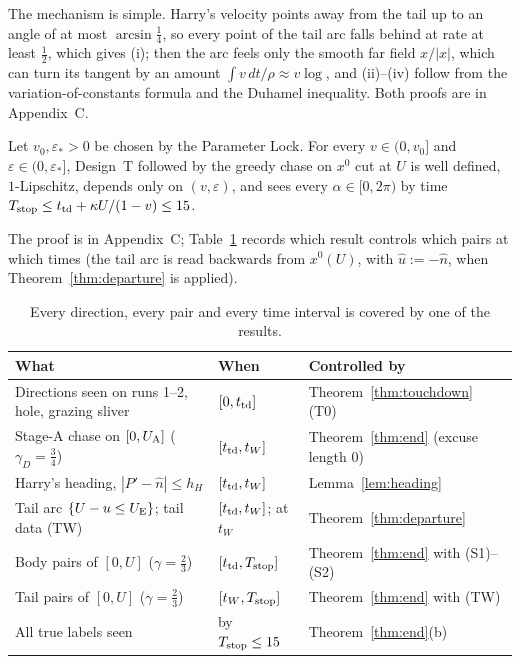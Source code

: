 The mechanism is simple. Harry's velocity points away from the tail up to an angle of at most $\arcsin\frac14$, so every
point of the tail arc falls behind at rate at least $\frac12$, which gives (i); then the arc feels only the smooth far
field $x/|x|$, which can turn its tangent by an amount $\int v\,dt/\rho\approx v\log$, and (ii)--(iv) follow from the
variation-of-constants formula and the Duhamel inequality. Both proofs are in Appendix~C.

\begin{proposition}[Conditional form for $d=1$]\label{prop:cond}
Let $v_0,\varepsilon_*>0$ be chosen by the Parameter Lock. For every $v\in(0,v_0]$ and $\varepsilon\in(0,\varepsilon_*]$,
Design~T followed by the greedy chase on $x^0$ cut at $U$ is well defined, $1$-Lipschitz, depends only on
$(v,\varepsilon)$, and sees every $\alpha\in[0,2\pi)$ by time $T_{\mathrm{stop}}\le t_{\mathrm{td}}+\kappa U/(1-v)\le15$.
\end{proposition}

The proof is in Appendix~C; Table~\ref{tab:coverage} records which result controls which pairs at which times (the
tail arc is read backwards from $x^0(U)$, with $\hat u:=-\hat n$, when Theorem~\ref{thm:departure} is applied).

\begin{table}[!htbp]
\centering
\small
\begin{tabularx}{\linewidth}{l l >{\raggedright\arraybackslash}X}
\toprule
\textbf{What} & \textbf{When} & \textbf{Controlled by} \\
\midrule
Directions seen on runs 1--2, hole, grazing sliver & $[0,t_{\mathrm{td}}]$ & Theorem~\ref{thm:touchdown} (T0) \\
Stage-A chase on $[0,U_{\mathrm{A}}]$ ($\gamma_D=\frac34$) & $[t_{\mathrm{td}},t_W]$ & Theorem~\ref{thm:end} (excuse length $0$) \\
Harry's heading, $|P'-\hat n|\le h_H$ & $[t_{\mathrm{td}},t_W]$ & Lemma~\ref{lem:heading} \\
Tail arc $\{U-u\le U_{\mathrm{E}}\}$; tail data (TW) & $[t_{\mathrm{td}},t_W]$; at $t_W$ & Theorem~\ref{thm:departure} \\
Body pairs of $[0,U]$ ($\gamma=\frac23$) & $[t_{\mathrm{td}},T_{\mathrm{stop}}]$ & Theorem~\ref{thm:end} with (S1)--(S2) \\
Tail pairs of $[0,U]$ ($\gamma=\frac23$) & $[t_W,T_{\mathrm{stop}}]$ & Theorem~\ref{thm:end} with (TW) \\
All true labels seen & by $T_{\mathrm{stop}}\le15$ & Theorem~\ref{thm:end}(b) \\
\bottomrule
\end{tabularx}
\caption{Every direction, every pair and every time interval is covered by one of the results.}
\label{tab:coverage}
\end{table}

